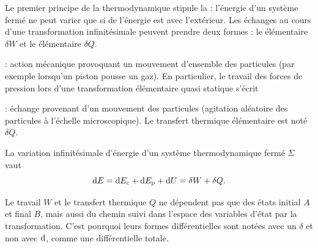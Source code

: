 \documentclass[12pt,fancy]{cours}
\begin{document}
Le premier principe de la thermodynamique stipule la  : l'énergie d'un système fermé ne peut varier que si de l'énergie est  avec l'extérieur. Les échanges au cours d'une transformation infinitésimale peuvent prendre deux formes : le  élémentaire $\delta W$ et le  élémentaire $\delta Q$.
\begin{liste}\item
{} : action mécanique provoquant un mouvement d'ensemble  des particules (par exemple lorsqu'un piston pousse un gaz). En particulier, le travail des forces de pression lors d'une transformation élémentaire quasi statique s'écrit
\item {} : échange provenant d'un mouvement  des particules (agitation aléatoire des particules à l'échelle microscopique). Le transfert thermique élémentaire est noté $\delta Q$.

\end{liste}

\begin{theorem}\label{form:1p}
  La variation infinitésimale d'énergie  d'un système thermodynamique fermé $\Sigma$ vaut
  \begin{equation*}
  \mathrm{d} E = \mathrm{d} E_{\rm c} + \mathrm{d} E_{\rm p} + \mathrm{d} U = \delta W + \delta Q.
  \end{equation*}
  \end{theorem}

  \begin{danger}
    Le travail $W$ et le transfert thermique $Q$ ne dépendent pas que des états initial $A$ et final $B$, mais aussi du chemin suivi dans l'espace des variables d'état par la transformation. C'est pourquoi leurs formes différentielles sont notées avec un $\delta$ et non avec $\mathrm{d}$, comme une différentielle totale.
  \end{danger} 

\end{document}
